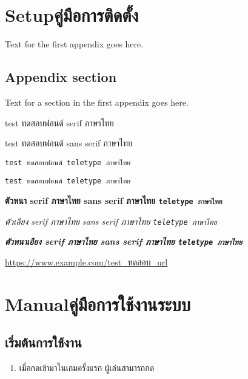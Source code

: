 \chapter{\ifenglish Setup\else คู่มือการติดตั้ง\fi}

Text for the first appendix goes here.

\section{Appendix section}

Text for a section in the first appendix goes here.

test ทดสอบฟอนต์ serif ภาษาไทย

\textsf{test ทดสอบฟอนต์ sans serif ภาษาไทย}

\verb+test ทดสอบฟอนต์ teletype ภาษาไทย+

\texttt{test ทดสอบฟอนต์ teletype ภาษาไทย}

\textbf{ตัวหนา serif ภาษาไทย \textsf{sans serif ภาษาไทย} \texttt{teletype ภาษาไทย}}

\textit{ตัวเอียง serif ภาษาไทย \textsf{sans serif ภาษาไทย} \texttt{teletype ภาษาไทย}}

\textbf{\textit{ตัวหนาเอียง serif ภาษาไทย \textsf{sans serif ภาษาไทย} \texttt{teletype ภาษาไทย}}}

\url{https://www.example.com/test_ทดสอบ_url}

\chapter{\ifenglish Manual\else คู่มือการใช้งานระบบ\fi}

\section{เริ่มต้นการใช้งาน}
\begin{enumerate}
    \item เมื่อกดเข้ามาในเกมครั้งแรก ผู้เล่นสามารถกด 
\end{enumerate}
